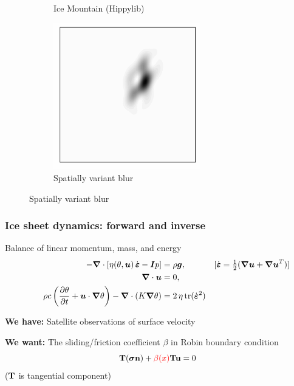 \documentclass[10pt,final,xcolor=dvipsnames]{beamer}
\newcommand{\gbf}[1]{\boldsymbol{#1}}
\newcommand{\bs}[1]{\ensuremath{\boldsymbol{#1}}}
\newcommand{\edot}{\dot{\gbf{\varepsilon}}}
\newcommand{\tcr}[1]{\ensuremath{\textcolor{red}{{#1}}}}
\begin{document}
\begin{frame}
\begin{figure}
\begin{subfigure}[b]{0.49\textwidth}
			\caption{Ice Mountain (Hippylib)}
		\end{subfigure}
		\begin{subfigure}[b]{0.49\textwidth}
		\centering
		\includegraphics[width=0.7\textwidth]{frog_problem.pdf}
		\caption{Spatially variant blur}
	\end{subfigure}
	\end{figure}
\end{frame}

\begin{frame}
\frametitle{Ice sheet dynamics: forward and inverse}

\begin{block}{Balance of linear momentum, mass, and energy}
  \[
  \begin{aligned}
    - \gbf{\nabla} \cdot \left[ \eta(\theta,\gbf{u}) \, \edot
      -\gbf{I}p \right] &= \rho \gbf{g},
    &[\edot = \tfrac 12  (\gbf{\nabla u} + \gbf{\nabla  u}^T)]
    \hspace{-2em}
    \\
    \gbf{\nabla} \cdot \gbf{u} &= 0,
    \vspace{-2em} \\
    \rho c \left(\frac{\partial \theta}{\partial t} + \gbf{u} \cdot \gbf{\nabla}
    \theta\right)  - \gbf{\nabla} \cdot (K \gbf{\nabla} \theta)
    &= 2 \, \eta \, \mathrm{tr}(\edot^2)
  \end{aligned}
  \]
\end{block}
\vspace{0.5cm}
\textbf{We have:} Satellite observations of surface velocity

\vspace{0.5cm}

\textbf{We want:} The sliding/friction coefficient $\beta$ in
Robin boundary condition
\begin{equation*}
{\bf T}(\bs \sigma {\bf n}) + \tcr{\beta (x)}{\bf T}{\bf u} = 0
\end{equation*}
($\bf T$ is tangential component)

\end{frame}
\end{document}
